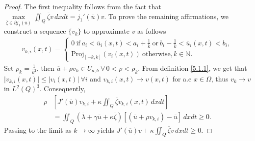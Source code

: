 \documentclass[reqno]{amsart}
\begin{document}
	\begin{proof}
		The first inequality follows from the fact that $\displaystyle \underset{\overline{\zeta}\in \partial j_1(\overline{u})}{\max} \iint_Q \overline{\zeta}v \,dxdt =j_1'(\overline{u})v$.
		To prove the remaining affirmations, we construct a sequence $\{ v_k \}$ to approximate $v$ as follows
		\begin{equation} \label{5.1.1}
			\begin{aligned} v_{k,i}(x,t)=
				\begin{cases}
					0 \ \text{if} \ a_i < \overline{u}_i(x,t) < a_i + \frac{1}{k} \ \text{or} \ b_i -\frac{1}{k} < \overline{u}_i(x,t) < b_i,\\
					\text{Proj}_{[-k,k]} \left(v_i(x,t)\right) \ \text{otherwise}, k\in \mathbb{N}.
				\end{cases}
			\end{aligned}
		\end{equation}
		Set $\rho_k=\frac{1}{k^2}$, then $\overline{u}+\rho v_k \in U_{a,b} \ \forall \, 0<\rho<\rho_k$.
		From definition \eqref{5.1.1}, we get that $\displaystyle \vert v_{k,i}(x,t) \vert \leq \vert v_i(x,t) \vert \ \forall i$ and $\displaystyle v_{k,i}(x,t) \rightarrow v(x,t)$ for a.e $x\in \Omega$, thus $v_k \rightarrow v$ in $L^2(Q)^3$.
		Consequently,
		\begin{align*}
			\rho & \left[ J'(\overline{u})v_{k,i} + \kappa \iint_Q \overline{\zeta}v_{k,i}(x,t) \, dxdt \right] \\ 
			&= \iint_Q \left( \overline{\lambda} + \gamma \overline{u} + \kappa \overline{\zeta} \right) \left[ \left( \overline{u} + \rho v_{k,i} \right) - \overline{u} \right] \, dxdt \geq 0.
		\end{align*}
		Passing to the limit as $k \rightarrow \infty$ yields $\displaystyle J'(\overline{u})v + \kappa \iint_Q \overline{\zeta} v \, dxdt \geq 0$.
	\end{proof}
	
\end{document}
